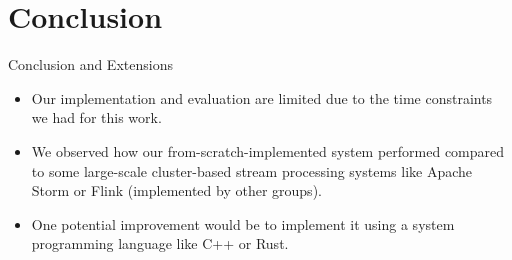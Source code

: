 \documentclass[9pt]{beamer}
\begin{document}


\section{Conclusion}





\begin{frame}[fragile]{Conclusion and Extensions}
    \begin{itemize}
        \item Our implementation and evaluation are limited due to the time constraints we had for this work.
        
        \item We observed how our from-scratch-implemented system performed compared to some large-scale cluster-based stream processing systems like Apache Storm or Flink (implemented by other groups).
        
        \item One potential improvement would be to implement it using a system programming language like C++ or Rust.
        
    \end{itemize}

    
    

\end{frame}





\begin{frame}[fragile]{  }
    

\end{frame}
\end{document}
